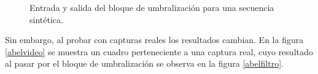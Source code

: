 \begin{figure}[ht!]
         \hspace{-1cm}
       \hspace{1 mm}
  \caption{Entrada y salida del bloque de umbralización para una secuencia sintética.}
      \label{resUmbralizacion}
\end{figure}

Sin embargo, al probar con capturas reales los resultados cambian. En la figura \ref{abelvideo} se muestra un cuadro perteneciente a una captura real, cuyo resultado al pasar por el bloque de umbralización se observa en la figura \ref{abelfiltro}. 


